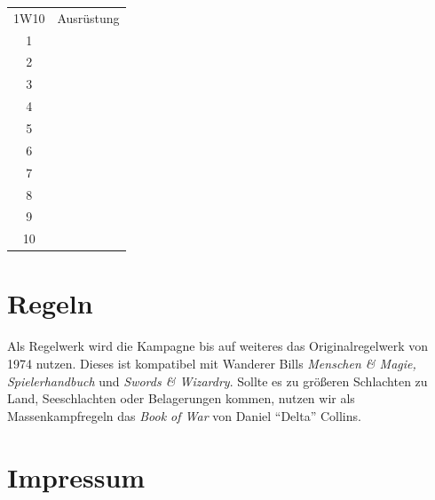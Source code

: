 \documentclass[11pt]{wbzine}
\begin{document}
\begin{multicols}{2}
\begin{tabularx}{\columnwidth}{cZ}
    1W10 & Ausrüstung \\
1 &
\\

2 &
\\

3 &
\\

4 &
\\

5 &
\\

6 &
\\

7 &
\\

8 &
\\

9 &
\\

10 &
\\

\end{tabularx}


\section{Regeln}

    Als Regelwerk wird die Kampagne
    bis auf weiteres das Originalregelwerk von 1974 nutzen. Dieses 
    ist kompatibel mit Wanderer Bills \textit{Menschen \& Magie,
    Spielerhandbuch} und \textit{Swords \& Wizardry}. Sollte es zu
    größeren Schlachten zu Land, Seeschlachten oder Belagerungen
    kommen, nutzen wir als Massenkampfregeln das \textit{Book of
    War} von Daniel ``Delta'' Collins.

\section{Impressum}

\end{multicols}
\end{document}
